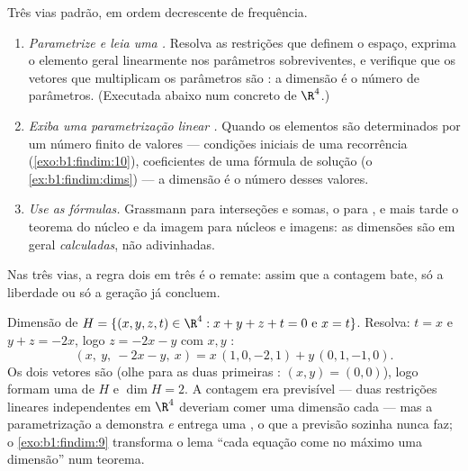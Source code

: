 \begin{method}
\label{met:b1:findim:computedim}
Três vias padrão, em ordem decrescente de frequência.
\begin{enumerate}
  \item \emph{Parametrize e leia uma .} Resolva as restrições
        que definem o espaço, exprima o elemento geral linearmente
        nos parâmetros sobreviventes, e verifique que os vetores
        que multiplicam os parâmetros são : a dimensão é o
        número de parâmetros. (Executada abaixo num 
        concreto de $\R^4$.)
  \item \emph{Exiba uma parametrização linear .} Quando os
        elementos são determinados por um número finito de valores
        --- condições iniciais de uma recorrência
        (\cref{exo:b1:findim:10}), coeficientes de uma fórmula de solução
        (o \cref{ex:b1:findim:dims}) --- a dimensão é o número desses valores.
  \item \emph{Use as fórmulas.} Grassmann para interseções e
        somas, o  para , e mais tarde o
        teorema do núcleo e da imagem para núcleos e imagens: as
        dimensões são em geral \emph{calculadas}, não adivinhadas.
\end{enumerate}
Nas três vias, a regra dois em três é o remate: assim que a
contagem bate, só a liberdade ou só a geração já concluem.
\end{method}

\begin{example}
\label{ex:b1:findim:parametrize}
Dimensão de $H = \{(x, y, z, t) \in \R^4 : x + y + z + t = 0
\text{ e } x = t\}$. Resolva: $t = x$ e $y + z = -2x$, logo $z =
-2x - y$ com $x, y$
:
\[
(x,\ y,\ -2x - y,\ x) = x\,(1, 0, -2, 1) + y\,(0, 1, -1, 0) .
\]
Os dois vetores são  (olhe para as duas primeiras
: $(x, y) = (0,0)$), logo formam uma  de $H$ e $\dim H = 2$.
A contagem era previsível --- duas restrições lineares
independentes em $\R^4$ deveriam comer uma dimensão cada --- mas a
parametrização a demonstra \emph{e} entrega uma , o que a
previsão sozinha nunca faz; o \cref{exo:b1:findim:9} transforma o lema ``cada
equação come no máximo uma dimensão'' num teorema.
\end{example}

